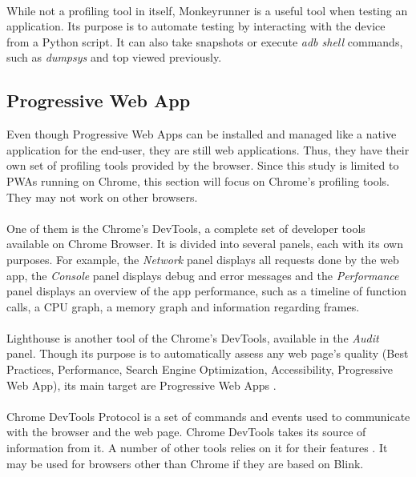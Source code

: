 \documentclass{kththesis}
\begin{document}
\paragraph{}
While not a profiling tool in itself, Monkeyrunner \cite{monkeyrunner} is a useful tool when testing an application. Its purpose is to automate testing by interacting with the device from a Python script. It can also take snapshots or execute \textit{adb shell} commands, such as \textit{dumpsys} and top viewed previously. 

\subsection{Progressive Web App}

Even though Progressive Web Apps can be installed and managed like a native application for the end-user, they are still web applications. Thus, they have their own set of profiling tools provided by the browser. Since this study is limited to PWAs running on Chrome, this section will focus on Chrome's profiling tools. They may not work on other browsers.

\paragraph{}
One of them is the Chrome's DevTools, a complete set of developer tools available on Chrome Browser. It is divided into several panels, each with its own purposes. For example, the \textit{Network} panel displays all requests done by the web app, the \textit{Console} panel displays debug and error messages and the \textit{Performance} panel \cite{chrome_devtools_perf} displays an overview of the app performance, such as a timeline of function calls, a CPU graph, a memory graph and information regarding frames. 

\paragraph{}
Lighthouse \cite{lighthouse} is another tool of the Chrome's DevTools, available in the \textit{Audit} panel. Though its purpose is to automatically assess any web page's quality (Best Practices, Performance, Search Engine Optimization, Accessibility, Progressive Web App), its main target are Progressive Web Apps \cite{PWApossibleUnifer}. 

\paragraph{}
Chrome DevTools Protocol \cite{CDP} is a set of commands and events used to communicate with the browser and the web page. Chrome DevTools takes its source of information from it. A number of other tools relies on it for their features \cite{awesome_CDP}. It may be used for browsers other than Chrome if they are based on Blink.
\end{document}
